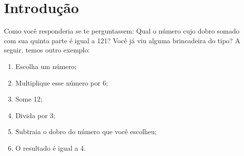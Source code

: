 \section{Introdução}

Como você responderia se te perguntassem: Qual o número cujo dobro somado com sua quinta parte é igual a 121? Você já viu alguma brincadeira do tipo? A seguir, temos outro exemplo:

\begin{enumerate}[label=\textbf{\arabic*}.]
  \item Escolha um número;
  \item Multiplique esse número por 6;
  \item Some 12;
  \item Divida por 3;
  \item Subtraia o dobro do número que você escolheu; 
  \item O resultado é igual a 4.
\end{enumerate}